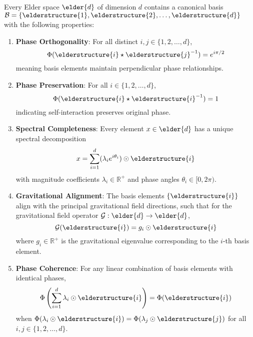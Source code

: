 \begin{theorem}
Every Elder space $\elder{d}$ of dimension $d$ contains a canonical basis $\mathcal{B} = \{\elderstructure{1}, \elderstructure{2}, \ldots, \elderstructure{d}\}$ with the following properties:
\begin{enumerate}
    \item \textbf{Phase Orthogonality}: For all distinct $i, j \in \{1, 2, \ldots, d\}$,
    \begin{equation}
        \Phi(\elderstructure{i} \star \elderstructure{j}^{-1}) = e^{i\pi/2}
    \end{equation}
    meaning basis elements maintain perpendicular phase relationships.
    
    \item \textbf{Phase Preservation}: For all $i \in \{1, 2, \ldots, d\}$,
    \begin{equation}
        \Phi(\elderstructure{i} \star \elderstructure{i}^{-1}) = 1
    \end{equation}
    indicating self-interaction preserves original phase.
    
    \item \textbf{Spectral Completeness}: Every element $x \in \elder{d}$ has a unique spectral decomposition
    \begin{equation}
        x = \sum_{i=1}^{d} (\lambda_i e^{i\theta_i}) \odot \elderstructure{i}
    \end{equation}
    with magnitude coefficients $\lambda_i \in \mathbb{R}^+$ and phase angles $\theta_i \in [0, 2\pi)$.
    
    \item \textbf{Gravitational Alignment}: The basis elements $\{\elderstructure{i}\}$ align with the principal gravitational field directions, such that for the gravitational field operator $\mathcal{G}: \elder{d} \rightarrow \elder{d}$,
    \begin{equation}
        \mathcal{G}(\elderstructure{i}) = g_i \odot \elderstructure{i}
    \end{equation}
    where $g_i \in \mathbb{R}^+$ is the gravitational eigenvalue corresponding to the $i$-th basis element.
    
    \item \textbf{Phase Coherence}: For any linear combination of basis elements with identical phases,
    \begin{equation}
        \Phi\left(\sum_{i=1}^{d} \lambda_i \odot \elderstructure{i}\right) = \Phi(\elderstructure{i})
    \end{equation}
    when $\Phi(\lambda_i \odot \elderstructure{i}) = \Phi(\lambda_j \odot \elderstructure{j})$ for all $i,j \in \{1,2,\ldots,d\}$.
\end{enumerate}
\end{theorem}

